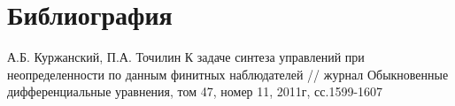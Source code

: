 \documentclass[a4paper, 12pt]{article}
\begin{document}
\newpage
\section{Библиография}

\begin{thebibliography}{}
	 А.Б. Куржанский, П.А. Точилин К задаче синтеза управлений при неопределенности по данным финитных наблюдателей //
	 журнал Обыкновенные дифференциальные уравнения, том 47, номер 11, 2011г, сс.1599-1607 
	
\end{thebibliography}
\end{document}
